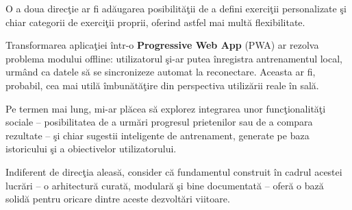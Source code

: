 O a doua direc\c tie ar fi ad\u augarea posibilit\u a\c tii de a
defini exerci\c tii personalizate \c si chiar categorii de exerci\c tii
proprii, oferind astfel mai mult\u a flexibilitate.

Transformarea aplica\c tiei \^ intr-o \textbf{Progressive Web App}
(PWA) ar rezolva problema modului offline: utilizatorul \c si-ar
putea \^ inregistra antrenamentul local, urm\^ and ca datele s\u a se
sincronizeze automat la reconectare. Aceasta ar fi, probabil,
cea mai util\u a \^ imbun\u at\u a\c tire din perspectiva utiliz\u arii
reale \^ in sal\u a.

Pe termen mai lung, mi-ar pl\u acea s\u a explorez integrarea unor
func\c tionalit\u a\c ti sociale -- posibilitatea de a urm\u ari
progresul prietenilor sau de a compara rezultate -- \c si chiar
sugestii inteligente de antrenament, generate pe baza istoricului
\c si a obiectivelor utilizatorului.

Indiferent de direc\c tia aleas\u a, consider c\u a fundamentul
construit \^ in cadrul acestei lucr\u ari -- o arhitectur\u a curat\u a,
modular\u a \c si bine documentat\u a -- ofer\u a o baz\u a solid\u a
pentru oricare dintre aceste dezvolt\u ari viitoare.
